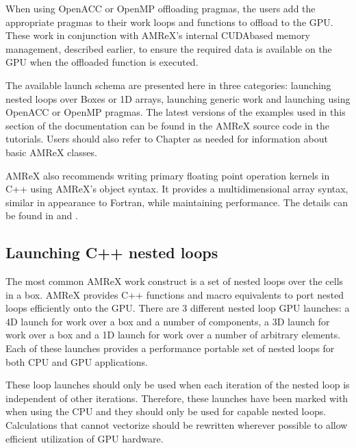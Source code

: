\documentclass[letterpaper,10pt,english]{sphinxmanual}
\begin{document}
\sphinxAtStartPar
When using OpenACC or OpenMP offloading pragmas, the users add the appropriate
pragmas to their work loops and functions to offload to the GPU.  These work
in conjunction with AMReX’s internal CUDA\sphinxhyphen{}based memory management, described
earlier, to ensure the required data is available on the GPU when the offloaded
function is executed.

\sphinxAtStartPar
The available launch schema are presented here in three categories: launching
nested loops over Boxes or 1D arrays, launching generic work and launching using
OpenACC or  OpenMP pragmas. The latest versions of the examples used in this section
of the documentation can be found in the AMReX source code in the  tutorials.
Users should also refer to Chapter {\hyperref[\detokenize{Basics_Chapter:chap-basics}]{}} as needed for information about basic
AMReX classes.

\sphinxAtStartPar
AMReX also recommends writing primary floating point operation kernels
in C++ using AMReX’s  object syntax.  It provides a
multi\sphinxhyphen{}dimensional array syntax, similar in appearance to Fortran,
while maintaining performance.  The details can be found in
{\hyperref[\detokenize{Basics:sec-basics-array4}]{}} and {\hyperref[\detokenize{Basics:sec-basics-cppkernel}]{}}.


\subsection{Launching C++ nested loops}
\label{\detokenize{GPU:launching-c-nested-loops}}\label{\detokenize{GPU:sec-gpu-for}}
\sphinxAtStartPar
The most common AMReX work construct is a set of nested loops over
the cells in a box. AMReX provides C++ functions and macro equivalents to port nested
loops efficiently onto the GPU.  There are 3 different nested loop GPU
launches: a 4D launch for work over a box and a number of components, a 3D
launch for work over a box and a 1D launch for work over a number of arbitrary elements.
Each of these launches provides a performance portable set of nested loops for
both CPU and GPU applications.

\sphinxAtStartPar
These loop launches should only be used when each iteration of the
nested loop is independent of other iterations.  Therefore, these
launches have been marked with  when using the
CPU and they should only be used for \sphinxhyphen{}capable nested loops.
Calculations that cannot vectorize should be rewritten wherever
possible to allow efficient utilization of GPU hardware.
\end{document}
